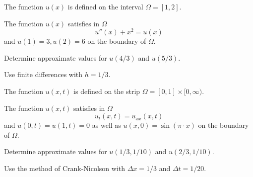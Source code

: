 \begin{teilaufgaben}
\item
The function $u(x)$ is defined on the interval $\Omega = [1,2]$.

The function $u(x)$ satisfies in $\Omega$ 
\[
u''(x) + x^2 = u(x)
\]
and  $u(1) = 3, u(2) = 6$ on the boundary of $\Omega$. 

Determine approximate values for $u(4/3)$ and $u(5/3)$. 

Use finite differences with $h = 1/3$. 

\item
The function $u(x,t)$ is defined on the strip
$\Omega = [0, 1] \times [0,\infty)$.

The function $u(x,t)$ satisfies in $\Omega$
\[
u_{t}(x,t) = u_{xx}(x,t)
\]
and $u(0,t) = u(1,t) = 0$ as well as $u(x,0) = \sin(\pi \cdot x)$
on the boundary of $\Omega$.

Determine approximate values for $u(1/3,1/10)$ and $u(2/3,1/10)$.

Use the method of Crank-Nicolson with $\Delta x = 1/3$ and $\Delta t = 1/20.$
\end{teilaufgaben}

